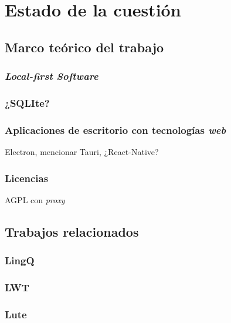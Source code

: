 \chapter{Estado de la cuestión}  

\section{Marco teórico del trabajo}

\subsection{\textit{Local-first Software}}
\parencite{Kleppmann}
\parencite{Kuhn}

\subsection{¿SQLIte?}

\subsection{Aplicaciones de escritorio con tecnologías \textit{web}}

Electron, mencionar Tauri, ¿React-Native?

\subsection{Licencias}

AGPL con \textit{proxy}

\section{Trabajos relacionados}

\subsection{LingQ}

\subsection{LWT}

\subsection{Lute}
